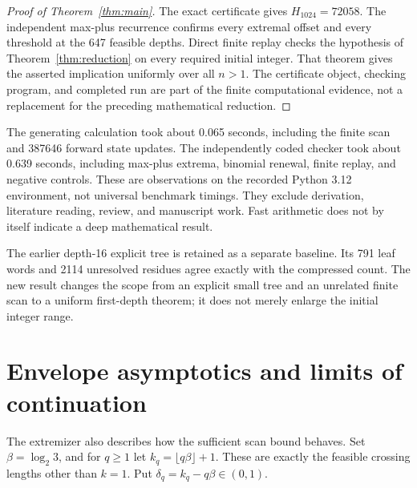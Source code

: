 \documentclass[11pt,a4paper]{amsart}
\theoremstyle{definition}
\theoremstyle{remark}
\begin{document}
\begin{proof}[Proof of Theorem~\ref{thm:main}]
The exact certificate gives $H_{1024}=72058$. The independent max-plus
recurrence confirms every extremal offset and every threshold at the 647
feasible depths. Direct finite replay checks the hypothesis of
Theorem~\ref{thm:reduction} on every required initial integer.
That theorem gives the asserted implication uniformly over all $n>1$.
The certificate object, checking program, and completed run are part of
the finite computational evidence, not a replacement for the preceding
mathematical reduction.
\end{proof}

The generating calculation took about 0.065 seconds, including the
finite scan and 387646 forward state updates. The independently coded
checker took about 0.639 seconds, including max-plus extrema, binomial
renewal, finite replay, and negative controls. These are observations
on the recorded Python 3.12 environment, not universal benchmark timings.
They exclude derivation, literature reading, review, and manuscript work.
Fast arithmetic does not by itself indicate a deep mathematical result.

The earlier depth-16 explicit tree is retained as a separate baseline.
Its 791 leaf words and 2114 unresolved residues agree exactly with the
compressed count. The new result changes the scope from an explicit
small tree and an unrelated finite scan to a uniform first-depth theorem;
it does not merely enlarge the initial integer range.

\section{Envelope asymptotics and limits of continuation}
The extremizer also describes how the sufficient scan bound behaves.
Set $\beta=\log_2 3$, and for $q\ge1$ let
$k_q=\lfloor q\beta\rfloor+1$. These are exactly the feasible crossing
lengths other than $k=1$. Put $\delta_q=k_q-q\beta\in(0,1)$.
\end{document}
